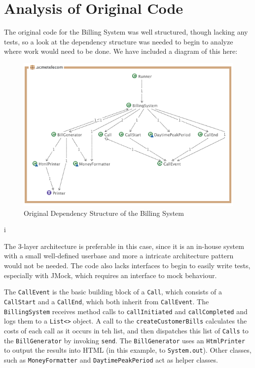 \documentclass[a4paper,12pt,oneside,final]{article}
\newenvironment{changemargin}[2]{\begin{list}{}{%
\setlength{\topsep}{0pt}%
\setlength{\leftmargin}{0pt}%
\setlength{\rightmargin}{0pt}%
\setlength{\listparindent}{\parindent}%
\setlength{\itemindent}{\parindent}%
\setlength{\parsep}{0pt plus 1pt}%
\addtolength{\leftmargin}{#1}%
\addtolength{\rightmargin}{#2}%
}\item }{\end{list}}
\begin{document}
\section{Analysis of Original Code} %
The original code for the Billing System was well structured, though lacking any tests, so a look at the dependency structure was needed to begin to analyze where work would need to be done.  We have included a diagram of this here:
\begin{figure}[!h]
\begin{changemargin}{-20mm}{-20mm}
\center
\includegraphics[scale=0.55]{Original_Structure.png}
\caption{Original Dependency Structure of the Billing System}
\end{changemargin}
\end{figure}i

The 3-layer architecture is preferable in this case, since it is an in-house system with a small well-defined userbase and more a intricate architecture pattern would not be needed. The code also lacks interfaces to begin to easily write tests, especially with JMock, which requires an interface to mock behaviour.  

The \verb+CallEvent+ is the basic building block of a \verb+Call+, which consists of a \verb+CallStart+ and a \verb+CallEnd+, which both inherit from \verb+CallEvent+.  The \verb+BillingSystem+ receives method calls to \verb+callInitiated+ and \verb+callCompleted+ and logs them to a \verb+List<>+ object.  A call to the \verb+createCustomerBills+ calculates the costs of each call as it occurs in teh list, and then dispatches this list of \verb+Calls+ to the \verb+BillGenerator+ by invoking \verb+send+.  The \verb+BillGenerator+ uses an \verb+HtmlPrinter+ to output the results into HTML (in this example, to \verb+System.out+).  Other classes, such as \verb+MoneyFormatter+ and \verb+DaytimePeakPeriod+ act as helper classes.
\end{document}
